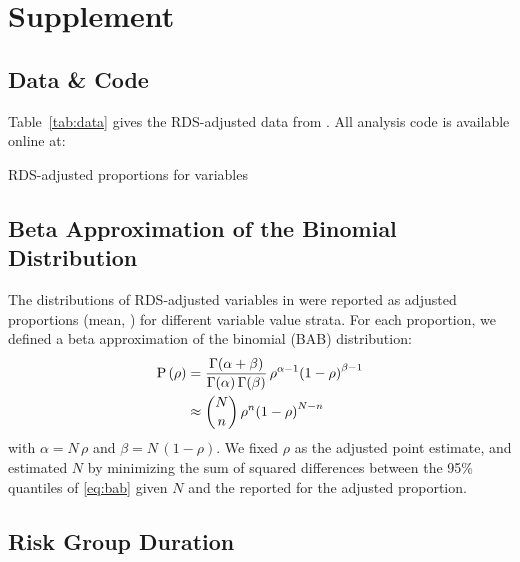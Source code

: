 \section{Supplement}
\subsection{Data \& Code}\label{app.data}
Table~\ref{tab:data} gives the RDS-adjusted data from \cite{Baral2014}.
All analysis code is available online at:\\
\begin{table}[h]
  \centering
  \caption{RDS-adjusted proportions for variables}
  
  \label{tab:data}
\end{table}
\subsection{Beta Approximation of the Binomial Distribution}\label{app.bab}
The distributions of RDS-adjusted variables in \cite{Baral2014} were reported as
adjusted proportions (mean, \ci) for different variable value strata.
For each proportion, we defined a beta approximation of the binomial (BAB) distribution:
\begin{alignat}{1}\label{eq:bab}
  \mathrm{P}\,(\rho) &=
    \frac{\Gamma(\alpha+\beta)}{\Gamma(\alpha)\,\Gamma(\beta)}\,
    \rho^{\alpha-1}{(1 - \rho)}^{\beta-1} \\
    &\approx {N \choose n} \, \rho^{n}{(1 - \rho)}^{N - n} \nonumber
\end{alignat}
with $\alpha = N\,\rho$ and $\beta = N\,(1-\rho)$.
We fixed $\rho$ as the adjusted point estimate,
and estimated $N$ by minimizing the sum of squared differences between
the 95\% quantiles of \eqref{eq:bab} given $N$ and the reported \ci for the adjusted proportion.
\subsection{Risk Group Duration}\label{app.yss}
